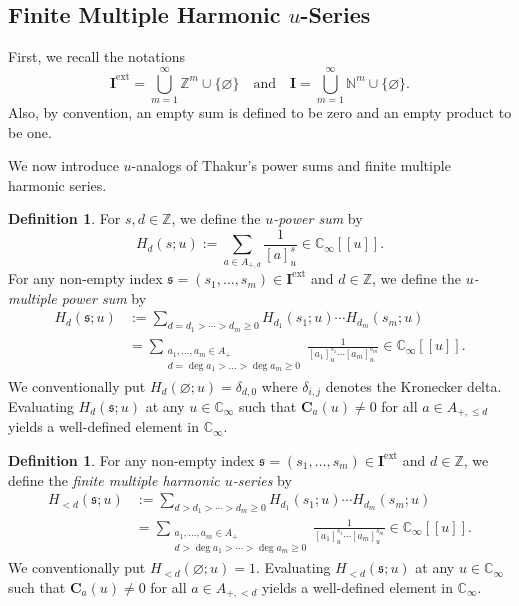 \documentclass[12pt,reqno]{amsart}
\numberwithin{equation}{section}
\theoremstyle{plain}
\theoremstyle{definition}
\newtheorem{df}[thm]{Definition}
\theoremstyle{remark}
\newcommand{\ZZ}{\mathbb{Z}}
\newcommand{\NN}{\mathbb{N}}
\newcommand{\CC}{\mathbb{C}}
\newcommand{\mbb}[1]{[\![{#1}]\!]}
\newcommand{\ww}[1]{\mathfrak{#1}}
\newcommand{\C}{\mathbf{C}}
\newcommand{\Ical}{\mathbf{I}}
\newcommand{\ext}{\mathrm{ext}}
\begin{document}
\subsection{Finite Multiple Harmonic \texorpdfstring{$u$}{u}-Series}\label{section:3.1}
First, we recall the notations
$$\Ical^{\ext}=\bigcup_{m=1}^\infty \ZZ^m \cup \{\varnothing\}\quad\text{and}\quad\Ical = \bigcup_{m=1}^\infty \NN^m \cup \{\varnothing\}.$$
Also, by convention, an empty sum is defined to be zero and an empty product to be one.

We now introduce $u$-analogs of Thakur's power sums and finite multiple harmonic series.
\begin{df}
    For $s,d\in\ZZ$, we define the
    \textit{$u$-power sum} by
    $$H_d(s;u):=\sum_{a\in A_{+,d}}\frac{1}{[a]_u^s}\in\CC_\infty\mbb{u}.$$
    For any non-empty index $\ww{s}=(s_1,\ldots,s_m)\in\Ical^{\ext}$ and $d\in\ZZ$, we define the
    \textit{$u$-multiple power sum} by
    \begin{align*}
        H_d(\ww{s};u)&:=\sum_{d=d_1>\cdots>d_m\geq 0}H_{d_1}(s_1;u)\cdots H_{d_m}(s_m;u)\\
        &=\sum_{\substack{a_1,\ldots,a_m\in A_+\\d=\deg a_1>\ldots>\deg a_m\geq 0}} \frac{1}{[a_1]_u^{s_1}\cdots[a_m]_u^{s_m}}\in\CC_\infty\mbb{u}.
    \end{align*}
    We conventionally put $H_d(\varnothing;u)=\delta_{d,0}$ where $\delta_{i,j}$ denotes the Kronecker delta. Evaluating $H_{d}(\ww{s};u)$ at any $u\in\CC_\infty$ such that $\C_a(u)\neq 0$ for all $a\in A_{+,\leq d}$ yields a well-defined element in $\CC_\infty$. 
\end{df}

\begin{df}\label{df:fmhus}
    For any non-empty index $\ww{s}=(s_1,\ldots,s_m)\in\Ical^{\ext}$ and $d\in\ZZ$, we define the \textit{finite multiple harmonic $u$-series} by
    \begin{align*}
        H_{<d}(\ww{s};u)&:=\sum_{d>d_1>\cdots>d_m\geq 0}H_{d_1}(s_1;u)\cdots H_{d_m}(s_m;u)\\&=
        \sum_{\substack{a_1,\ldots,a_m\in A_+\\d>\deg a_1>\cdots>\deg a_m\geq 0}}\frac{1}{[a_1]_{u}^{s_1}\cdots [a_m]_{u}^{s_m}}\in\CC_\infty\mbb{u}.
    \end{align*}
    We conventionally put $H_{<d}(\varnothing;u)=1$. Evaluating $H_{<d}(\ww{s};u)$ at any $u\in\CC_\infty$ such that $\C_a(u)\neq 0$ for all $a\in A_{+,< d}$ yields a well-defined element in $\CC_\infty$.
\end{df}
\end{document}
